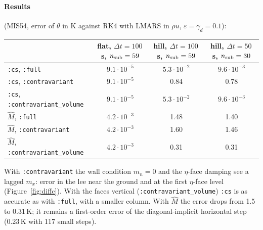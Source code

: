\documentclass[11pt,a4paper]{article}
\newcommand{\code}[1]{\texttt{#1}}
\newcommand{\dt}{\Delta t}
\begin{document}
\paragraph{Results} (MIS54, error of $\theta$ in K against RK4 with LMARS in $\rho u$, $\varepsilon=\gamma_d=0.1$):
\begin{center}\footnotesize\setlength{\tabcolsep}{4pt}
\begin{tabular}{lccc}\toprule
 & flat, $\dt=100$\,s, $n_{\rm sub}=59$ & hill, $\dt=100$\,s, $n_{\rm sub}=59$ & hill, $\dt=50$\,s, $n_{\rm sub}=30$\\\midrule
\code{:cs}, \code{:full} & $9.1\cdot10^{-5}$ & $5.3\cdot10^{-2}$ & $9.6\cdot10^{-3}$\\
\code{:cs}, \code{:contravariant} & $9.1\cdot10^{-5}$ & 0.84 & 0.78\\
\code{:cs}, \code{:contravariant\_volume} & $9.1\cdot10^{-5}$ & $5.3\cdot10^{-2}$ & $9.6\cdot10^{-3}$\\
$\hat M$, \code{:full} & $4.2\cdot10^{-3}$ & 1.48 & 1.40\\
$\hat M$, \code{:contravariant} & $4.2\cdot10^{-3}$ & 1.60 & 1.46\\
$\hat M$, \code{:contravariant\_volume} & $4.2\cdot10^{-3}$ & 0.31 & 0.31\\\bottomrule
\end{tabular}
\end{center}
With \code{:contravariant} the wall condition $m_n=0$ and the $\eta$-face damping see a lagged $m_x$: error in the lee near the ground and at the
first $\eta$-face level (Figure~\ref{fig:diffc}). With the faces vertical (\code{:contravariant\_volume}) \code{:cs} is as accurate as with \code{:full}, with a
smaller column. With $\hat M$ the error drops from 1.5 to 0.31\,K; it remains a first-order error of the diagonal-implicit horizontal step
(0.23\,K with 117 small steps).
\end{document}
